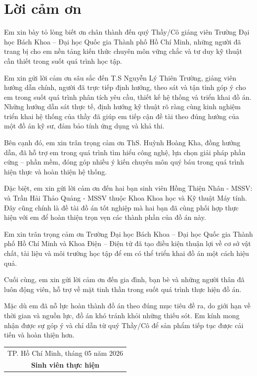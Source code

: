 \chapter*{Lời cảm ơn}
Em xin bày tỏ lòng biết ơn chân thành đến quý Thầy/Cô giảng viên Trường Đại học Bách Khoa – Đại học Quốc gia Thành phố Hồ Chí Minh, những người đã trang bị cho em nền tảng kiến thức chuyên môn vững chắc và tư duy kỹ thuật cần thiết trong suốt quá trình học tập.

Em xin gửi lời cảm ơn sâu sắc đến T.S Nguyễn Lý Thiên Trường, giảng viên hướng dẫn chính, người đã trực tiếp định hướng, theo sát và tận tình góp ý cho em trong suốt quá trình phân tích yêu cầu, thiết kế hệ thống và triển khai đồ án. Những hướng dẫn sát thực tế, định hướng kỹ thuật rõ ràng cùng kinh nghiệm triển khai hệ thống của thầy đã giúp em tiếp cận đề tài theo đúng hướng của một đồ án kỹ sư, đảm bảo tính ứng dụng và khả thi.

Bên cạnh đó, em xin trân trọng cảm ơn ThS. Huỳnh Hoàng Kha, đồng hướng dẫn, đã hỗ trợ em trong quá trình tìm hiểu công nghệ, lựa chọn giải pháp phần cứng – phần mềm, đóng góp nhiều ý kiến chuyên môn quý báu trong quá trình hiện thực và hoàn thiện hệ thống.

Đặc biệt, em xin gửi lời cảm ơn đến hai bạn sinh viên Hồng Thiện Nhân - MSSV: và Trần Hải Thảo Quảng - MSSV thuộc Khoa Khoa học và Kỹ thuật Máy tính. Đây cũng chính là đề tài đồ án tốt nghiệp mà hai bạn đã cùng phối hợp thực hiện với em để hoàn thiện trọn vẹn các thành phần của đồ án này.

Em xin trân trọng cảm ơn Trường Đại học Bách Khoa – Đại học Quốc gia Thành phố Hồ Chí Minh và Khoa Điện – Điện tử đã tạo điều kiện thuận lợi về cơ sở vật chất, tài liệu và môi trường học tập để em có thể triển khai đồ án một cách hiệu quả.

Cuối cùng, em xin gửi lời cảm ơn đến gia đình, bạn bè và những người thân đã luôn động viên, hỗ trợ về mặt tinh thần trong suốt quá trình thực hiện đồ án.

Mặc dù em đã nỗ lực hoàn thành đồ án theo đúng mục tiêu đề ra, do giới hạn về thời gian và nguồn lực, đồ án khó tránh khỏi những thiếu sót. Em kính mong nhận được sự góp ý và chỉ dẫn từ quý Thầy/Cô để sản phẩm tiếp tục được cải tiến và hoàn thiện hơn.

\vspace{1.5em}

\begin{flushright}
    \begin{tabular}{c}
        TP. Hồ Chí Minh, tháng 05 năm 2026 \\
        \textbf{Sinh viên thực hiện}
    \end{tabular}
\end{flushright}